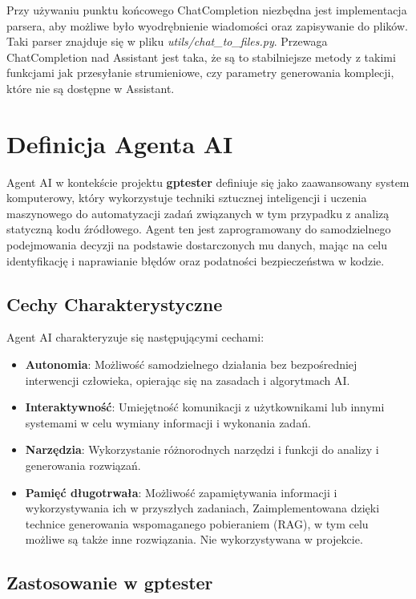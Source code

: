 \restoregeometry

Przy używaniu punktu końcowego ChatCompletion niezbędna jest implementacja parsera, aby możliwe było wyodrębnienie wiadomości oraz zapisywanie do plików. Taki parser znajduje się w pliku \textit{utils/chat\_to\_files.py}. Przewaga ChatCompletion nad Assistant jest taka, że są to stabilniejsze metody z takimi funkcjami jak przesyłanie strumieniowe, czy parametry generowania komplecji, które nie są dostępne w Assistant. 

\section{Definicja Agenta AI}
Agent AI w kontekście projektu \textbf{gptester} definiuje się jako zaawansowany system komputerowy, który wykorzystuje techniki sztucznej inteligencji i uczenia maszynowego do automatyzacji zadań związanych w tym przypadku z analizą statyczną kodu źródłowego. Agent ten jest zaprogramowany do samodzielnego podejmowania decyzji na podstawie dostarczonych mu danych, mając na celu identyfikację i naprawianie błędów oraz podatności bezpieczeństwa w kodzie.

\subsection{Cechy Charakterystyczne}

Agent AI charakteryzuje się następującymi cechami:

\begin{itemize}
    \item \textbf{Autonomia}: Możliwość samodzielnego działania bez bezpośredniej interwencji człowieka, opierając się na zasadach i algorytmach AI.
    \item \textbf{Interaktywność}: Umiejętność komunikacji z użytkownikami lub innymi systemami w celu wymiany informacji i wykonania zadań.
    \item \textbf{Narzędzia}: Wykorzystanie różnorodnych narzędzi i funkcji do analizy i generowania rozwiązań.
    \item \textbf{Pamięć długotrwała}: Możliwość zapamiętywania informacji i wykorzystywania ich w przyszłych zadaniach, Zaimplementowana dzięki technice generowania wspomaganego pobieraniem (RAG), w tym celu możliwe są także inne rozwiązania. Nie wykorzystywana w projekcie.
\end{itemize}

\subsection{Zastosowanie w \textbf{gptester}}

